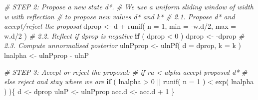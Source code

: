 \documentclass[
]{article}
\newenvironment{Shaded}{\begin{snugshade}}{\end{snugshade}}
\newcommand{\AttributeTok}[1]{\textcolor[rgb]{0.77,0.63,0.00}{#1}}
\newcommand{\CommentTok}[1]{\textcolor[rgb]{0.56,0.35,0.01}{\textit{#1}}}
\newcommand{\ControlFlowTok}[1]{\textcolor[rgb]{0.13,0.29,0.53}{\textbf{#1}}}
\newcommand{\DecValTok}[1]{\textcolor[rgb]{0.00,0.00,0.81}{#1}}
\newcommand{\FunctionTok}[1]{\textcolor[rgb]{0.00,0.00,0.00}{#1}}
\newcommand{\NormalTok}[1]{#1}
\newcommand{\OtherTok}[1]{\textcolor[rgb]{0.56,0.35,0.01}{#1}}
\newcommand{\SpecialCharTok}[1]{\textcolor[rgb]{0.00,0.00,0.00}{#1}}
\begin{document}
\begin{Shaded}
\begin{Highlighting}[]
    \CommentTok{\# STEP 2: Propose a new state d*.}
    \CommentTok{\# We use a uniform sliding window of width w with reflection}
    \CommentTok{\# to propose new values d* and k*}
    \CommentTok{\# 2.1. Propose d* and accept/reject the proposal}
\NormalTok{    dprop }\OtherTok{\textless{}{-}}\NormalTok{ d }\SpecialCharTok{+} \FunctionTok{runif}\NormalTok{( }\AttributeTok{n =} \DecValTok{1}\NormalTok{, }\AttributeTok{min =} \SpecialCharTok{{-}}\NormalTok{w.d}\SpecialCharTok{/}\DecValTok{2}\NormalTok{, }\AttributeTok{max =}\NormalTok{ w.d}\SpecialCharTok{/}\DecValTok{2}\NormalTok{ )}
    \CommentTok{\# 2.2. Reflect if dprop is negative}
    \ControlFlowTok{if}\NormalTok{ ( dprop }\SpecialCharTok{\textless{}} \DecValTok{0}\NormalTok{ ) dprop }\OtherTok{\textless{}{-}} \SpecialCharTok{{-}}\NormalTok{dprop}
    \CommentTok{\# 2.3. Compute unnormalised posterior}
\NormalTok{    ulnPprop }\OtherTok{\textless{}{-}} \FunctionTok{ulnPf}\NormalTok{( }\AttributeTok{d =}\NormalTok{ dprop, }\AttributeTok{k =}\NormalTok{ k )}
\NormalTok{    lnalpha  }\OtherTok{\textless{}{-}}\NormalTok{ ulnPprop }\SpecialCharTok{{-}}\NormalTok{ ulnP}

    \CommentTok{\# STEP 3: Accept or reject the proposal:}
    \CommentTok{\#            if ru \textless{} alpha accept proposed d*}
    \CommentTok{\#            else reject and stay where we are}
    \ControlFlowTok{if}\NormalTok{ ( lnalpha }\SpecialCharTok{\textgreater{}} \DecValTok{0} \SpecialCharTok{||} \FunctionTok{runif}\NormalTok{( }\AttributeTok{n =} \DecValTok{1}\NormalTok{ ) }\SpecialCharTok{\textless{}} \FunctionTok{exp}\NormalTok{( lnalpha ) )\{}
\NormalTok{      d      }\OtherTok{\textless{}{-}}\NormalTok{ dprop}
\NormalTok{      ulnP   }\OtherTok{\textless{}{-}}\NormalTok{ ulnPprop}
\NormalTok{      acc.d  }\OtherTok{\textless{}{-}}\NormalTok{ acc.d }\SpecialCharTok{+} \DecValTok{1}
\NormalTok{    \}}


\end{Highlighting}
\end{Shaded}
\end{document}
